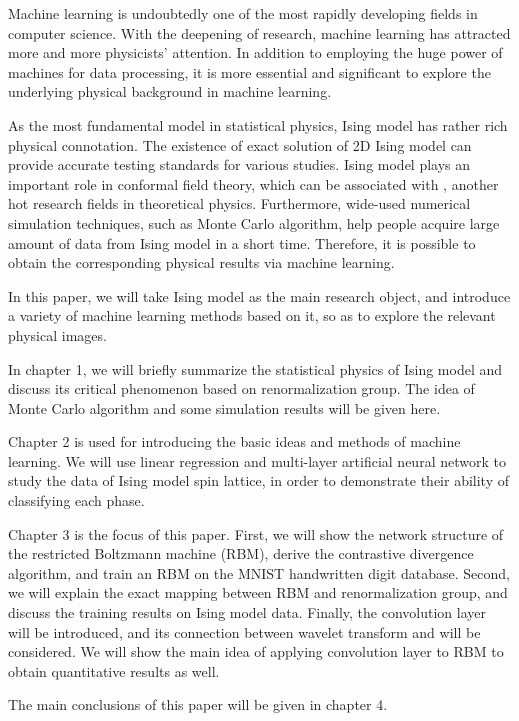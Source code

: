 Machine learning is undoubtedly one of the most rapidly developing fields in computer science.
With the deepening of research, machine learning has attracted more and more physicists' attention.
In addition to employing the huge power of machines for data processing, it is more essential and
significant to explore the underlying physical background in machine learning.

As the most fundamental model in statistical physics, Ising model has rather rich physical
connotation. The existence of exact solution of 2D Ising model can provide accurate testing
standards for various studies. Ising model plays an important role in conformal field theory,
which can be associated with \AdSCFT{}, another hot research fields in theoretical physics.
Furthermore, wide-used numerical simulation techniques, such as Monte Carlo algorithm, help people
acquire large amount of data from Ising model in a short time. Therefore, it is possible to obtain
the corresponding physical results via machine learning.

In this paper, we will take Ising model as the main research object, and introduce a variety of
machine learning methods based on it, so as to explore the relevant physical images.

In chapter 1, we will briefly summarize the statistical physics of Ising model and discuss its
critical phenomenon based on renormalization group. The idea of Monte Carlo algorithm and some
simulation results will be given here.

Chapter 2 is used for introducing the basic ideas and methods of machine learning. We will use
linear regression and multi-layer artificial neural network to study the data of Ising model spin
lattice, in order to demonstrate their ability of classifying each phase.

Chapter 3 is the focus of this paper. First, we will show the network structure of the restricted
Boltzmann machine (RBM), derive the contrastive divergence algorithm, and train an RBM on the MNIST
handwritten digit database. Second, we will explain the exact mapping between RBM and
renormalization group, and discuss the training results on Ising model data. Finally, the
convolution layer will be introduced, and its connection between wavelet transform and \AdSCFT{}
will be considered. We will show the main idea of applying convolution layer to RBM to obtain
quantitative results as well.

The main conclusions of this paper will be given in chapter 4.
